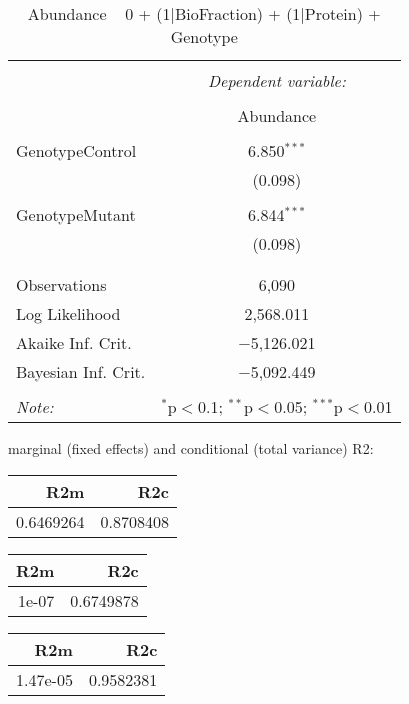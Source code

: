 \documentclass[11pt]{report}
\begin{document}
\begin{table}[!htbp] \centering 
  \caption{Abundance ~ 0 + (1|BioFraction) + (1|Protein) + Genotype} 
  \label{} 
\begin{tabular}{@{\extracolsep{5pt}}lc} 
\\[-1.8ex]\hline 
\hline \\[-1.8ex] 
 & \multicolumn{1}{c}{\textit{Dependent variable:}} \\ 
\cline{2-2} 
\\[-1.8ex] & Abundance \\ 
\hline \\[-1.8ex] 
 GenotypeControl & 6.850$^{***}$ \\ 
  & (0.098) \\ 
  & \\ 
 GenotypeMutant & 6.844$^{***}$ \\ 
  & (0.098) \\ 
  & \\ 
\hline \\[-1.8ex] 
Observations & 6,090 \\ 
Log Likelihood & 2,568.011 \\ 
Akaike Inf. Crit. & $-$5,126.021 \\ 
Bayesian Inf. Crit. & $-$5,092.449 \\ 
\hline 
\hline \\[-1.8ex] 
\textit{Note:}  & \multicolumn{1}{r}{$^{*}$p$<$0.1; $^{**}$p$<$0.05; $^{***}$p$<$0.01} \\ 
\end{tabular} 
\end{table} 
marginal (fixed effects) and conditional (total variance) R2:

\begin{tabular}{r|r}
\hline
R2m & R2c\\
\hline
0.6469264 & 0.8708408\\
\hline
\end{tabular}

\begin{tabular}{r|r}
\hline
R2m & R2c\\
\hline
1e-07 & 0.6749878\\
\hline
\end{tabular}

\begin{tabular}{r|r}
\hline
R2m & R2c\\
\hline
1.47e-05 & 0.9582381\\
\hline
\end{tabular}
\end{document}
